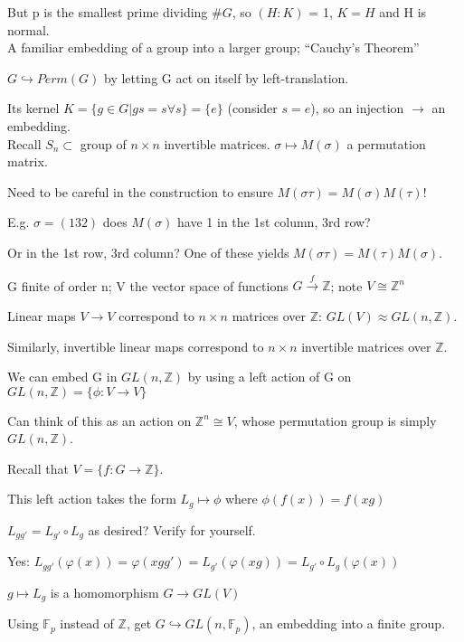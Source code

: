 \documentclass[12pt]{article}
\begin{document}
But p is the smallest prime dividing $\#G$, so $(H : K)$ = 1, $K = H$ and H is normal.\\

\noindent
A familiar embedding of a group into a larger group; ``Cauchy's Theorem''

$G \hookrightarrow Perm(G)$ by letting G act on itself by left-translation.

Its kernel $K = \{g \in G | gs=s \forall s\} = \{e\}$ (consider $s = e$), so an injection $\to$ an embedding.\\

\noindent
Recall $S_n \subset$ group of $n \times n$ invertible matrices. $\sigma \mapsto M(\sigma)$ a permutation matrix.

Need to be careful in the construction to ensure $M(\sigma\tau)=M(\sigma)M(\tau)$!

E.g. $\sigma = (1 3 2)$ does $M(\sigma)$ have 1 in the 1st column, 3rd row?

Or in the 1st row, 3rd column?  One of these yields $M(\sigma\tau) = M(\tau)M(\sigma)$.

\noindent
G finite of order n; V the vector space of functions $G \xrightarrow{f} \mathds{Z}$; note $V \cong \mathds{Z}^n$

Linear maps $V \to V$ correspond to $n \times n$ matrices over $\mathds{Z}$:  $GL(V) \approx GL(n, \mathds{Z})$.

Similarly, invertible linear maps correspond to $n \times n$ invertible matrices over $\mathds{Z}$.

We can embed G in $GL(n, \mathds{Z})$ by using a left action of G on $GL(n, \mathds{Z}) = \{\phi: V \to V\}$

Can think of this as an action on $\mathds{Z}^n \cong V$, whose permutation group is simply $GL(n, \mathds{Z})$.

Recall that $V = \{f : G \to \mathds{Z}\}$.

This left action takes the form $L_g \mapsto \phi$ where $\phi(f(x)) = f(xg)$

$L_{gg'} = L_{g'} \circ L_{g}$ as desired? Verify for yourself.

Yes: $L_{gg'}(\varphi (x)) = \varphi(xgg') = L_{g'}(\varphi (xg)) = L_{g'} \circ L_g (\varphi(x))$

$g \mapsto L_g$ is a homomorphism $G \to GL(V)$

Using $\mathds{F}_p$ instead of $\mathds{Z}$, get $G \hookrightarrow GL(n, \mathds{F}_p)$, an embedding into a finite group.
\end{document}
